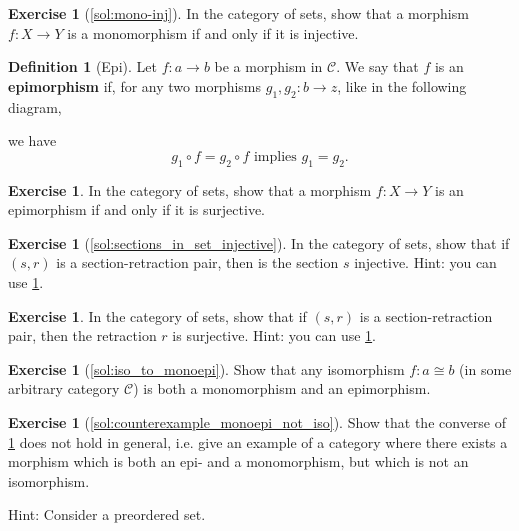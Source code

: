 \documentclass[a4paper,10pt]{scrartcl}
\theoremstyle{plain}
\theoremstyle{definition}
\newtheorem{dfn}[thm]{Definition}
\newtheorem{exer}[thm]{Exercise}
\newcommand{\Cat}[1]{\mathcal{#1}}
\newcommand{\CC}{\Cat{C}}
\newcommand{\co}[2]{\ensuremath{#2 \circ #1}}
\begin{document}
\begin{exer}[\cref{sol:mono-inj}]\label{ex:mono-inj}
  In the category of sets, show that a morphism $f : X \to Y$ is a monomorphism if and only if it is injective.
\end{exer}

\begin{dfn}[Epi]
  Let $f : a \to b$ be a morphism in $\CC$. We say that $f$ is an \textbf{epimorphism} if, for any two morphisms $g_1, g_2 : b \to z$, like in the following diagram,
  \begin{center}
  \end{center}
  we have
  \[ \co{f}{g_1} = \co{f}{g_2} \text{ implies } g_1 = g_2 .\]
\end{dfn}

\begin{exer}\label{ex:epi-surj}
  In the category of sets, show that a morphism $f : X \to Y$ is an epimorphism if and only if it is surjective.
\end{exer}


\begin{exer}[\cref{sol:sections_in_set_injective}]\label{exer:sections_in_set_injective}
  In the category of sets, show that if $(s,r)$ is a section-retraction pair, then is the section $s$ injective.
  Hint: you can use \cref{ex:mono-inj}.
\end{exer}
\begin{exer}
  In the category of sets, show that if $(s,r)$ is a section-retraction pair, then the retraction $r$ is surjective.
    Hint: you can use \cref{ex:epi-surj}.
\end{exer}

\begin{exer}[\cref{sol:iso_to_monoepi}]\label{exer:iso_to_monoepi}
  Show that any isomorphism $f : a\cong b$ (in some arbitrary category $\CC$) is both a monomorphism and an epimorphism.
\end{exer}

\begin{exer}[\cref{sol:counterexample_monoepi_not_iso}]\label{exer:counterexample_monoepi_not_iso}
  Show that the converse of \cref{exer:iso_to_monoepi} does not hold in general, i.e. give an example of a category where there exists a morphism which is both an epi- and a monomorphism, but which is not an isomorphism.

Hint: Consider a preordered set.
\end{exer}
\end{document}

